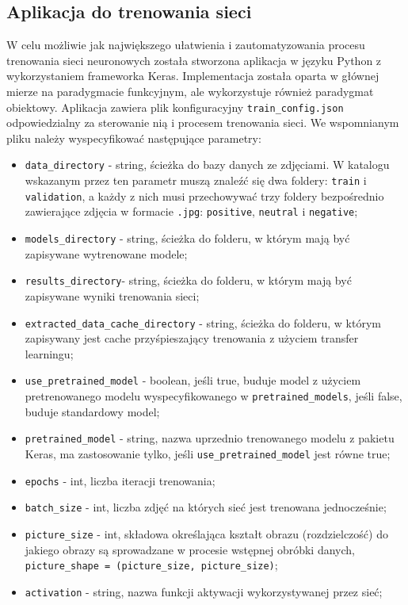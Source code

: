 \subsection{Aplikacja do trenowania sieci}
W celu możliwie jak największego ułatwienia i zautomatyzowania procesu trenowania sieci neuronowych została stworzona aplikacja w języku Python z wykorzystaniem frameworka Keras. Implementacja została oparta w głównej mierze na paradygmacie funkcyjnym, ale wykorzystuje również paradygmat obiektowy. Aplikacja zawiera plik konfiguracyjny \verb|train_config.json| odpowiedzialny za sterowanie nią i procesem trenowania sieci. We wspomnianym pliku należy wyspecyfikować następujące parametry:
\begin{itemize}
    \item \verb|data_directory| - string, ścieżka do bazy danych ze zdjęciami. W katalogu wskazanym przez ten parametr muszą znaleźć się dwa foldery: \verb|train| i \verb|validation|, a każdy z nich musi przechowywać trzy foldery bezpośrednio zawierające zdjęcia w formacie \verb|.jpg|: \verb|positive|, \verb|neutral| i \verb|negative|;
    \item \verb|models_directory| - string, ścieżka do folderu, w którym mają być zapisywane wytrenowane modele;
    \item \verb|results_directory|- string, ścieżka do folderu, w którym mają być zapisywane wyniki trenowania sieci;
    \item \verb|extracted_data_cache_directory| - string, ścieżka do folderu, w którym zapisywany jest cache przyśpieszający trenowania z użyciem transfer learningu;
    \item \verb|use_pretrained_model| - boolean, jeśli true, buduje model z użyciem pretrenowanego modelu wyspecyfikowanego w \verb|pretrained_models|, jeśli false, buduje standardowy model;
    \item \verb|pretrained_model| - string, nazwa uprzednio trenowanego modelu z pakietu Keras, ma zastosowanie tylko, jeśli \verb|use_pretrained_model| jest równe true;
    \item \verb|epochs| - int, liczba iteracji trenowania;
    \item \verb|batch_size| - int, liczba zdjęć na których sieć jest trenowana jednocześnie;
    \item \verb|picture_size| - int, składowa określająca kształt obrazu (rozdzielczość) do jakiego obrazy są sprowadzane w procesie wstępnej obróbki danych, \verb|picture_shape = (picture_size, picture_size)|;
    \item \verb|activation| - string, nazwa funkcji aktywacji wykorzystywanej przez sieć;

\end{itemize}
